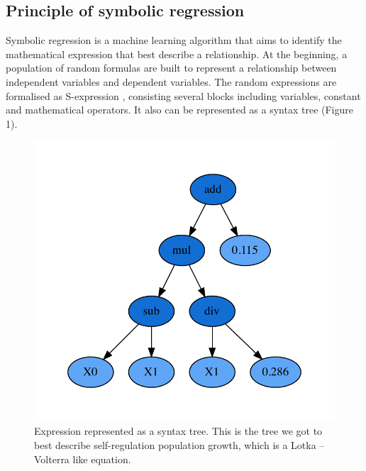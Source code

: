 \documentclass[11pt,a4paper]{article}
\begin{document}
\subsection{Principle of symbolic regression}
Symbolic regression is a machine learning algorithm that aims to identify the mathematical expression that best describe a relationship. At the beginning, a population of random formulas are built to represent a relationship between independent variables and dependent variables. The random expressions are formalised as S-expression \citep{Mccaatity}, consisting several blocks including variables, constant and mathematical operators. It also can be represented as a syntax tree (Figure 1). 
\begin{figure}[h!]
\centering
\includegraphics[scale = 0.6]{../Results/Syntax_tree.pdf}
\caption{Expression represented as a syntax tree. This is the tree we got to best describe self-regulation population growth, which is a Lotka – Volterra like equation.}
\end{figure}
\end{document}
